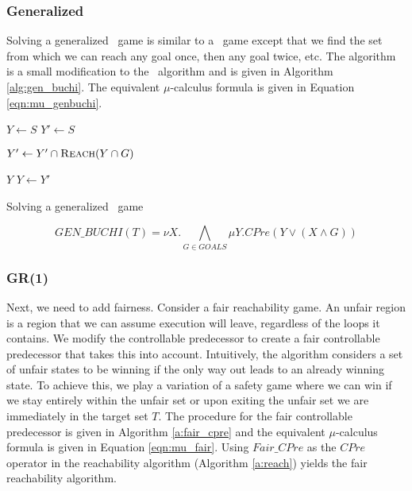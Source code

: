 \subsubsection{Generalized \buchi}

Solving a generalized \buchi\ game is similar to a \buchi\ game except that we find the set from which we can reach any goal once, then any goal twice, etc. The algorithm is a small modification to the \buchi\ algorithm and is given in Algorithm \ref{alg:gen_buchi}. The equivalent $\mu$-calculus formula is given in Equation \ref{eqn:mu_genbuchi}.

\begin{algorithm}[t]
\begin{algorithmic}
\State $Y \gets S$
\Loop
\State $Y' \gets S$

\State $Y' \gets Y' \cap \Call{Reach}{Y \cap G}$
\EndFor

\State\Return $Y$\EndIf
\State $Y \gets Y'$

\EndLoop
\EndFunction
\end{algorithmic}
\caption{Solving a generalized \buchi\ game}
\label{alg:gen_buchi}
\end{algorithm}

\begin{equation}
    \mathit{GEN\_BUCHI}(T) = \nu X. \bigwedge_{G \in GOALS} \mu Y. CPre(Y \vee (X \wedge G))
\label{eqn:mu_genbuchi}
\end{equation}

\subsubsection{GR(1)}

Next, we need to add fairness. Consider a fair reachability game. An unfair region is a region that we can assume execution will leave, regardless of the loops it contains. We modify the controllable predecessor to create a fair controllable predecessor that takes this into account. Intuitively, the algorithm considers a set of unfair states to be winning if the only way out leads to an already winning state. To achieve this, we play a variation of a safety game where we can win if we stay entirely within the unfair set or upon exiting the unfair set we are immediately in the target set $T$. The procedure for the fair controllable predecessor is given in Algorithm \ref{a:fair_cpre} and the equivalent $\mu$-calculus formula is given in Equation \ref{eqn:mu_fair}. Using $Fair\_CPre$ as the $CPre$ operator in the reachability algorithm (Algorithm \ref{a:reach}) yields the fair reachability algorithm. 


